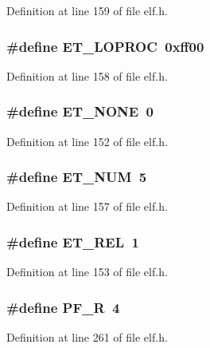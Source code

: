 Definition at line 159 of file elf.h.
\subsubsection[{ET\_\-LOPROC}]{\setlength{\rightskip}{0pt plus 5cm}\#define ET\_\-LOPROC~0xff00}\label{elf_8h_929894d9c68a7d9b8c29211b1e1a7469}




Definition at line 158 of file elf.h.
\subsubsection[{ET\_\-NONE}]{\setlength{\rightskip}{0pt plus 5cm}\#define ET\_\-NONE~0}\label{elf_8h_343a36d721130c5017a5669537e96822}




Definition at line 152 of file elf.h.
\subsubsection[{ET\_\-NUM}]{\setlength{\rightskip}{0pt plus 5cm}\#define ET\_\-NUM~5}\label{elf_8h_065cc675015de98ea740da6f36ffc9b5}




Definition at line 157 of file elf.h.
\subsubsection[{ET\_\-REL}]{\setlength{\rightskip}{0pt plus 5cm}\#define ET\_\-REL~1}\label{elf_8h_2a91046a80fd753ce3dbfb109212761d}




Definition at line 153 of file elf.h.
\subsubsection[{PF\_\-R}]{\setlength{\rightskip}{0pt plus 5cm}\#define PF\_\-R~4}\label{elf_8h_e529f935e58c029768c06fbc98b2ba8c}




Definition at line 261 of file elf.h.
